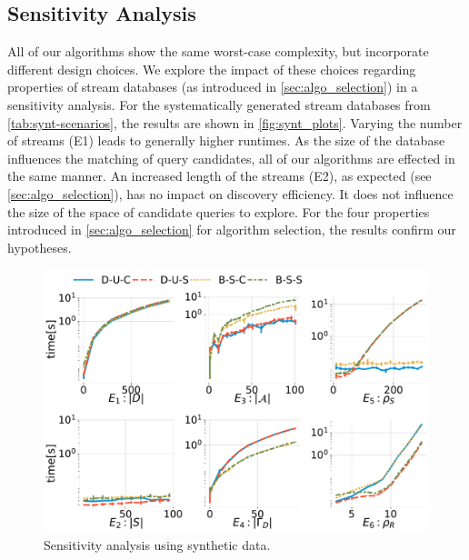 \subsection{Sensitivity Analysis}
\label{sec:exp_sensitity}
All of our algorithms show the same worst-case complexity, but incorporate
different design choices. We explore the impact of these choices regarding
properties of stream databases (as introduced in
\autoref{sec:algo_selection}) in a sensitivity analysis.
For the systematically generated stream databases from
\autoref{tab:synt-scenarios}, the results are shown in \autoref{fig:synt_plots}.
Varying the number of streams (E1) leads to generally higher runtimes. As
the size of the database influences the matching of query
candidates, all of our algorithms are effected in the same manner.
An increased length of the streams (E2), as expected (see
\autoref{sec:algo_selection}), has no impact on discovery efficiency. It
does not influence the size of the space of candidate queries to explore.
For the four properties introduced in \autoref{sec:algo_selection} for
algorithm selection, the results
confirm our hypotheses.
\begin{figure}
	\centering
	\includegraphics[width=0.95\columnwidth]{img/synt_plots.pdf}
	\vspace{-1em}
	\caption{Sensitivity analysis using synthetic data.}
	\label{fig:synt_plots}
	\vspace{-.5em}
\end{figure}
